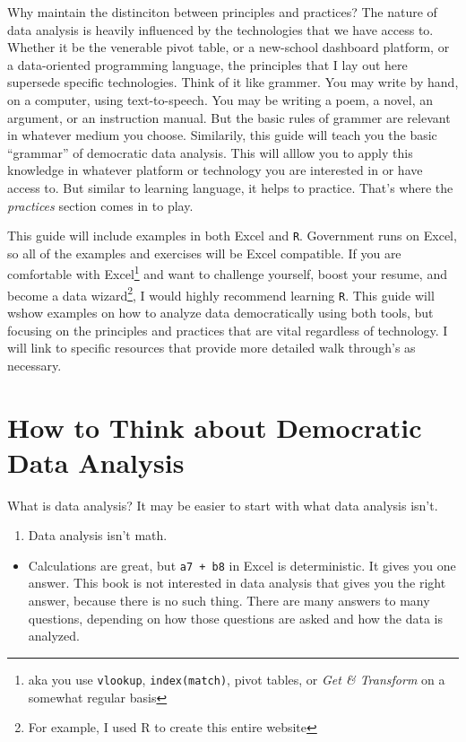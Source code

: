 \documentclass[]{book}
\providecommand{\tightlist}{%
  \setlength{\itemsep}{0pt}\setlength{\parskip}{0pt}}
\begin{document}
Why maintain the distinciton between principles and practices? The nature of data analysis is heavily influenced by the technologies that we have access to. Whether it be the venerable pivot table, or a new-school dashboard platform, or a data-oriented programming language, the principles that I lay out here supersede specific technologies. Think of it like grammer. You may write by hand, on a computer, using text-to-speech. You may be writing a poem, a novel, an argument, or an instruction manual. But the basic rules of grammer are relevant in whatever medium you choose. Similarily, this guide will teach you the basic ``grammar'' of democratic data analysis. This will alllow you to apply this knowledge in whatever platform or technology you are interested in or have access to. But similar to learning language, it helps to practice. That's where the \emph{practices} section comes in to play.

This guide will include examples in both Excel and \texttt{R}. Government runs on Excel, so all of the examples and exercises will be Excel compatible. If you are comfortable with Excel\footnote{aka you use \texttt{vlookup}, \texttt{index(match)}, pivot tables, or \emph{Get \& Transform} on a somewhat regular basis} and want to challenge yourself, boost your resume, and become a data wizard\footnote{For example, I used R to create this entire website}, I would highly recommend learning \texttt{R}. This guide will wshow examples on how to analyze data democratically using both tools, but focusing on the principles and practices that are vital regardless of technology. I will link to specific resources that provide more detailed walk through's as necessary.

\hypertarget{how-to-think-about-democratic-data-analysis}{%
\section{How to Think about Democratic Data Analysis}\label{how-to-think-about-democratic-data-analysis}}

What is data analysis? It may be easier to start with what data analysis isn't.

\begin{enumerate}
\def\labelenumi{\arabic{enumi}.}
\tightlist
\item
  Data analysis isn't math.
\end{enumerate}

\begin{itemize}
\tightlist
\item
  Calculations are great, but \texttt{a7\ +\ b8} in Excel is deterministic. It gives you one answer. This book is not interested in data analysis that gives you the right answer, because there is no such thing. There are many answers to many questions, depending on how those questions are asked and how the data is analyzed.
\end{itemize}
\end{document}
